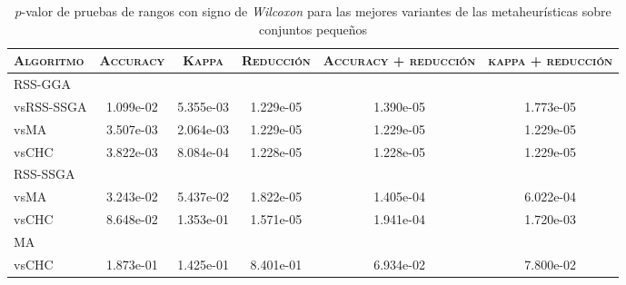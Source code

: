 \begin{table}[h!]
\centering
\begin{adjustbox}{max width =\textwidth}
\begin{tabular}{l c c c c c}
\hline
	\textsc{Algoritmo}
	& \multicolumn{1}{c}{\textsc{Accuracy}}
	& \multicolumn{1}{c}{\textsc{Kappa}}
	& \multicolumn{1}{c}{\textsc{Reducción}} 
	& \multicolumn{1}{c}{\textsc{Accuracy + reducción}} 
	& \multicolumn{1}{c}{\textsc{kappa + reducción}} \\
\hline
\hline

RSS-GGA\\
vsRSS-SSGA & 1.099e-02 & 5.355e-03 & 1.229e-05 & 1.390e-05 & 1.773e-05 \\
vsMA & 3.507e-03 & 2.064e-03 & 1.229e-05 & 1.229e-05 & 1.229e-05 \\ 
vsCHC & 3.822e-03 & 8.084e-04 & 1.228e-05 & 1.228e-05 & 1.229e-05 \\

\hline 

RSS-SSGA\\
vsMA  & 3.243e-02 & 5.437e-02 & 1.822e-05 & 1.405e-04 & 6.022e-04 \\
vsCHC & 8.648e-02 & 1.353e-01 & 1.571e-05 & 1.941e-04 & 1.720e-03 \\

\hline

MA\\
vsCHC & 1.873e-01 & 1.425e-01 & 8.401e-01 & 6.934e-02 & 7.800e-02 \\

\hline

\end{tabular}
\end{adjustbox}
\caption[Pruebas de \emph{Wilcoxon} entre las mejores variaciones de cada metaheurística para conjuntos pequeños]{$p$-valor de pruebas de rangos con signo de \emph{Wilcoxon} para las mejores variantes de las metaheurísticas sobre conjuntos pequeños}
\label{wilcox-best-peq}
\end{table}

